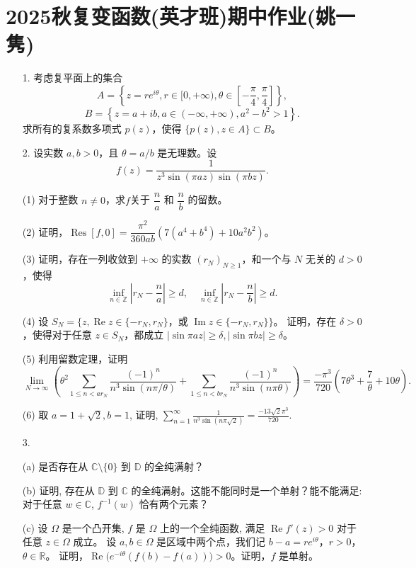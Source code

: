\section{2025秋复变函数(英才班)期中作业(姚一隽)}
\begin{enumerate}
\item [1.]考虑复平面上的集合
\[
A = \left\{ z = re^{i\theta}, r \in [0, +\infty), \theta \in \left[ -\frac{\pi}{4}, \frac{\pi}{4} \right] \right\},
\]
\[
B = \left\{ z = a + ib, a \in (-\infty, +\infty), a^2 - b^2 > 1 \right\}.
\]
求所有的复系数多项式 \( p(z) \)，使得 \(\{p(z), z \in A\} \subset B\)。


\item [2.]设实数 \(a, b > 0\)，且 \(\theta = a/b\) 是无理数。设
\[
f(z) = \frac{1}{z^3 \sin(\pi az) \sin(\pi bz)}.
\]
\item[(1)] 对于整数 \(n \neq 0\)，求\(f\)关于 \(\dfrac{n}{a}\) 和 \(\dfrac{n}{b}\) 的留数。
\item[(2)] 证明，\(\operatorname{Res}[f, 0] = \dfrac{\pi^2}{360ab}(7(a^4 + b^4) + 10a^2b^2)\)。
\item[(3)] 证明，存在一列收敛到 \(+\infty\) 的实数 \((r_N)_{N \geqslant 1}\)，和一个与 \(N\) 无关的 \(d > 0\)，使得
\[
\inf_{n \in \mathbb{Z}} \left| r_N - \frac{n}{a} \right| \geqslant d, \quad \inf_{n \in \mathbb{Z}} \left| r_N - \frac{n}{b} \right| \geqslant d.
\]
\item[(4)] 设 \(S_N = \{z, \operatorname{Re} z \in \{-r_N, r_N\}\)，或 \(\operatorname{Im} z \in \{-r_N, r_N\}\}\)。
证明，存在 \(\delta > 0\)，使得对于任意 \(z \in S_N\)，都成立 \(|\sin \pi az| \geqslant \delta, |\sin \pi bz| \geqslant \delta\)。
\item[(5)] 利用留数定理，证明
\[
\lim_{N \to \infty} \left( \theta^2 \sum_{1 \leqslant n < a r_N} \frac{(-1)^n}{n^3 \sin(n \pi / \theta)} 
+ \sum_{1 \leqslant n < b r_N} \frac{(-1)^n}{n^3 \sin(n \pi \theta)} \right) 
= \frac{-\pi^3}{720} \left( 7 \theta^3 + \frac{7}{\theta} + 10 \theta \right).
\]
\item[(6)] 取 \(a = 1 + \sqrt{2}, b = 1\), 证明, \(\displaystyle\sum_{n=1}^{\infty} \frac{1}{n^3 \sin(n \pi \sqrt{2})} = \frac{-13 \sqrt{2} \pi^3}{720}\).


\item[3.]
\item[(a)] 是否存在从 \(\mathbb{C} \setminus \{0\}\) 到 \(\mathbb{D}\) 的全纯满射？
\item[(b)] 证明, 存在从 \(\mathbb{D}\) 到 \(\mathbb{C}\) 的全纯满射。这能不能同时是一个单射？能不能满足: 对于任意 \(w \in \mathbb{C}\), \(f^{-1}(w)\) 恰有两个元素？
\item[(c)] 设 \(\Omega\) 是一个凸开集, \(f\) 是 \(\Omega\) 上的一个全纯函数, 满足 \(\operatorname{Re} f'(z) > 0\) 对于任意 \(z \in \Omega\) 成立。
设 \(a, b \in \Omega\) 是区域中两个点，我们记 \(b - a = re^{i\theta}\)，\(r > 0\)，\(\theta \in \mathbb{R}\)。
证明，\(\operatorname{Re} \big( e^{-i\theta}(f(b) - f(a)) \big) > 0\)。证明，\(f\) 是单射。



\end{enumerate}

